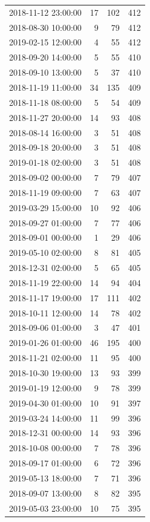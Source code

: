 \begin{tabular}{lrrr}
2018-11-12 23:00:00 & 17 & 102 & 412 \\
2018-08-30 10:00:00 & 9 & 79 & 412 \\
2019-02-15 12:00:00 & 4 & 55 & 412 \\
2018-09-20 14:00:00 & 5 & 55 & 410 \\
2018-09-10 13:00:00 & 5 & 37 & 410 \\
2018-11-19 11:00:00 & 34 & 135 & 409 \\
2018-11-18 08:00:00 & 5 & 54 & 409 \\
2018-11-27 20:00:00 & 14 & 93 & 408 \\
2018-08-14 16:00:00 & 3 & 51 & 408 \\
2018-09-18 20:00:00 & 3 & 51 & 408 \\
2019-01-18 02:00:00 & 3 & 51 & 408 \\
2018-09-02 00:00:00 & 7 & 79 & 407 \\
2018-11-19 09:00:00 & 7 & 63 & 407 \\
2019-03-29 15:00:00 & 10 & 92 & 406 \\
2018-09-27 01:00:00 & 7 & 77 & 406 \\
2018-09-01 00:00:00 & 1 & 29 & 406 \\
2019-05-10 02:00:00 & 8 & 81 & 405 \\
2018-12-31 02:00:00 & 5 & 65 & 405 \\
2018-11-19 22:00:00 & 14 & 94 & 404 \\
2018-11-17 19:00:00 & 17 & 111 & 402 \\
2018-10-11 12:00:00 & 14 & 78 & 402 \\
2018-09-06 01:00:00 & 3 & 47 & 401 \\
2019-01-26 01:00:00 & 46 & 195 & 400 \\
2018-11-21 02:00:00 & 11 & 95 & 400 \\
2018-10-30 19:00:00 & 13 & 93 & 399 \\
2019-01-19 12:00:00 & 9 & 78 & 399 \\
2019-04-30 01:00:00 & 10 & 91 & 397 \\
2019-03-24 14:00:00 & 11 & 99 & 396 \\
2018-12-31 00:00:00 & 14 & 93 & 396 \\
2018-10-08 00:00:00 & 7 & 78 & 396 \\
2018-09-17 01:00:00 & 6 & 72 & 396 \\
2019-05-13 18:00:00 & 7 & 71 & 396 \\
2018-09-07 13:00:00 & 8 & 82 & 395 \\
2019-05-03 23:00:00 & 10 & 75 & 395 \\

\end{tabular}

